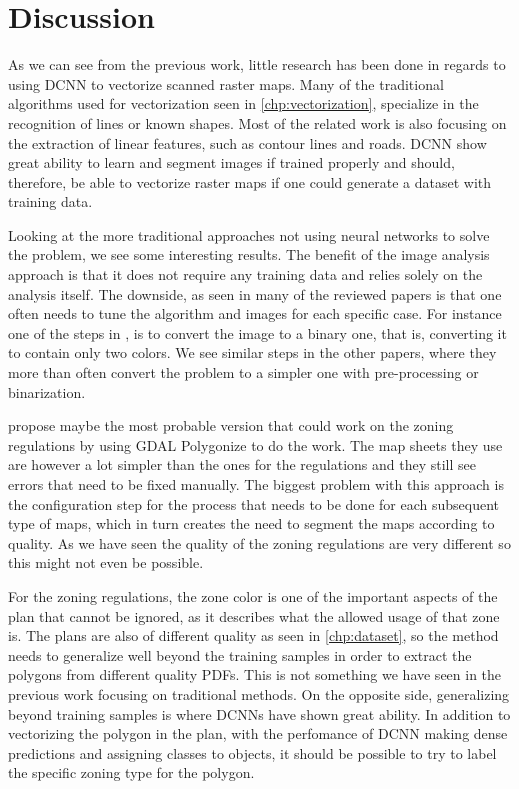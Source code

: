 \chapter{Discussion}
As we can see from the previous work, little research has been done in regards to using DCNN to vectorize scanned raster maps. Many of the traditional algorithms used for vectorization seen in \autoref{chp:vectorization}, specialize in the recognition of lines or known shapes. Most of the related work is also focusing on the extraction of linear features, such as contour lines and roads. DCNN show great ability to learn and segment images if trained properly and should, therefore, be able to vectorize raster maps if one could generate a dataset with training data.

Looking at the more traditional approaches not using neural networks to solve the problem, we see some interesting results. The benefit of the image analysis approach is that it does not require any training data and relies solely on the analysis itself. The downside, as seen in many of the reviewed papers is that one often needs to tune the algorithm and images for each specific case. For instance one of the steps in \citet{Iosifescu2016}, is to convert the image to a binary one, that is, converting it to contain only two colors. We see similar steps in the other papers, where they more than often convert the problem to a simpler one with pre-processing or binarization. 

\citet{GiraldoArteaga2013} propose maybe the most probable version that could work on the zoning regulations by using GDAL Polygonize to do the work. The map sheets they use are however a lot simpler than the ones for the regulations and they still see errors that need to be fixed manually. The biggest problem with this approach is the configuration step for the process that needs to be done for each subsequent type of maps, which in turn creates the need to segment the maps according to quality. As we have seen the quality of the zoning regulations are very different so this might not even be possible.

For the zoning regulations, the zone color is one of the important aspects of the plan that cannot be ignored, as it describes what the allowed usage of that zone is. The plans are also of different quality as seen in \autoref{chp:dataset}, so the method needs to generalize well beyond the training samples in order to extract the polygons from different quality PDFs. This is not something we have seen in the previous work focusing on traditional methods. On the opposite side, generalizing beyond training samples is where DCNNs have shown great ability. In addition to vectorizing the polygon in the plan, with the perfomance of DCNN making dense predictions and assigning classes to objects, it should be possible to try to label the specific zoning type for the polygon.

